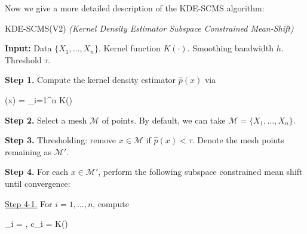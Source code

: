 \documentclass[letterpaper,fleqn]{article}
\theoremstyle{plain}
\theoremstyle{definition}
\newcommand{\1}{\mathds{1}}
\begin{document}
\newpage

Now we give a more detailed description of the KDE-SCMS algorithm\cite{algo}:

\begin{algorithm}[!htb]
\caption{KDE-SCMS(V2)  \textit{(Kernel Density Estimator Subspace Constrained Mean-Shift)}}
\begin{flushleft}
        \textbf{Input:} Data $\{X_1, \dots, X_n \}$. Kernel function $K(\cdot)$. Smoothing bandwidth $h$. Threshold $\tau$.\\
\end{flushleft}
\begin{algorithmic}
    \STATE \textbf{Step 1.} Compute the kernel density estimator $\hat{p}(x)$ via
        \begin{flalign*}
        (x) =  \sum_{i=1}^{n} K\left(\right)
        \end{flalign*}
        
    \STATE \textbf{Step 2.} Select a mesh $\mathcal{M}$ of points. By default, we can take $\mathcal{M} = \{X_1, \dots, X_n \}$.
    
    \STATE \textbf{Step 3.} Thresholding: remove $x \in \mathcal{M}$ if $\hat{p}(x) < \tau$. Denote the mesh points remaining as $\mathcal{M}'$.
    
    \STATE \textbf{Step 4.} For each $x \in \mathcal{M}'$, perform the following subspace constrained mean shift until convergence:
    
    \begin{ALC@g}
         \STATE \uline{Step 4-1.} For $i = 1, \dots, n$, compute
            \begin{flalign*}
                \mu_i = , \quad c_i = K\left(\right)
            \end{flalign*}
            

\end{ALC@g}
\end{algorithmic}
\end{algorithm}
\end{document}
